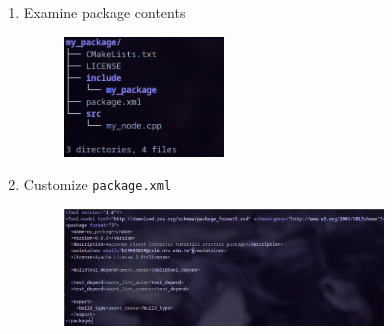 \documentclass[12pt, a4paper]{article}
\begin{document}
\begin{enumerate}
\newpage
\item Examine package contents
	\begin{figure}[h]
		\centering
		\includegraphics[width=0.4\textwidth]{2/p2.3-4}
	\end{figure}
\item Customize \texttt{package.xml}
	\begin{figure}[h]
		\centering
		\includegraphics[width=0.8\textwidth]{2/p2.3-5}
	\end{figure}
\end{enumerate}

\newpage
\end{document}
